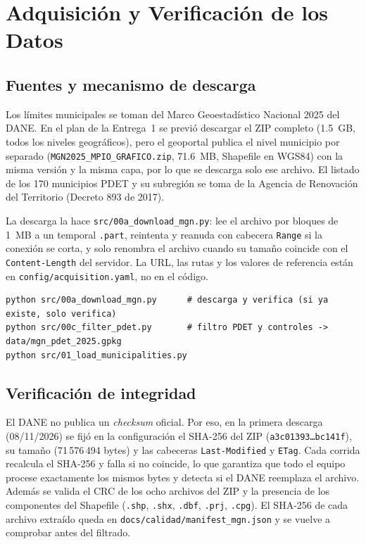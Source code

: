 \section{Adquisición y Verificación de los Datos}

\subsection{Fuentes y mecanismo de descarga}
Los límites municipales se toman del Marco Geoestadístico Nacional 2025 del DANE. En el plan de la Entrega~1 se
previó descargar el ZIP completo (1.5~GB, todos los niveles geográficos), pero el geoportal publica el nivel
municipio por separado (\texttt{MGN2025\_MPIO\_GRAFICO.zip}, 71.6~MB, Shapefile en WGS84) con la misma versión y la
misma capa, por lo que se descarga solo ese archivo. El listado de los 170 municipios PDET y su subregión se toma
de la Agencia de Renovación del Territorio (Decreto 893 de 2017).

La descarga la hace \texttt{src/00a\_download\_mgn.py}: lee el archivo por bloques de 1~MB a un temporal
\texttt{.part}, reintenta y reanuda con cabecera \texttt{Range} si la conexión se corta, y solo renombra el
archivo cuando su tamaño coincide con el \texttt{Content-Length} del servidor. La URL, las rutas y los valores de
referencia están en \texttt{config/acquisition.yaml}, no en el código.

\begin{lstlisting}[style=lab]
python src/00a_download_mgn.py      # descarga y verifica (si ya existe, solo verifica)
python src/00c_filter_pdet.py       # filtro PDET y controles -> data/mgn_pdet_2025.gpkg
python src/01_load_municipalities.py
\end{lstlisting}

\subsection{Verificación de integridad}
El DANE no publica un \emph{checksum} oficial. Por eso, en la primera descarga (08/11/2026) se fijó en la
configuración el SHA-256 del ZIP
(\texttt{a3c01393\ldots bc141f}), su tamaño (71\,576\,494 bytes) y las cabeceras \texttt{Last-Modified} y
\texttt{ETag}. Cada corrida recalcula el SHA-256 y falla si no coincide, lo que garantiza que todo el equipo
procese exactamente los mismos bytes y detecta si el DANE reemplaza el archivo. Además se valida el CRC de los ocho
archivos del ZIP y la presencia de los componentes del Shapefile (\texttt{.shp}, \texttt{.shx}, \texttt{.dbf},
\texttt{.prj}, \texttt{.cpg}). El SHA-256 de cada archivo extraído queda en \texttt{docs/calidad/manifest\_mgn.json}
y se vuelve a comprobar antes del filtrado.

